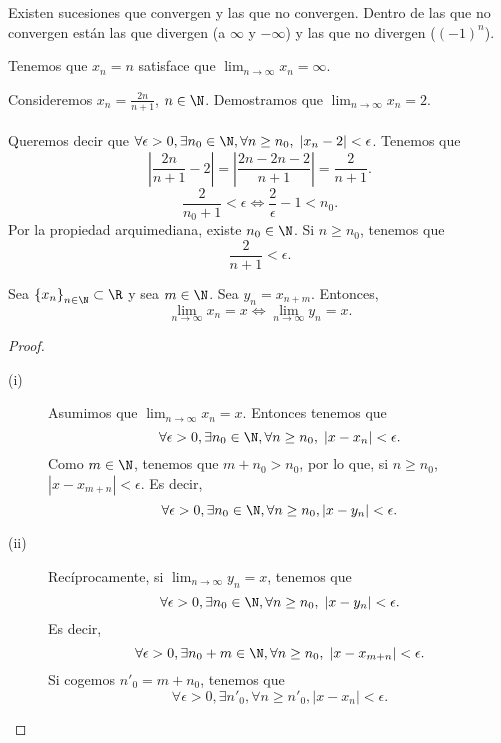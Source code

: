 \begin{observation}
\normalfont Existen sucesiones que convergen y las que no convergen. Dentro de las que no convergen están las que divergen (a $\displaystyle \infty $ y $\displaystyle -\infty $) y las que no divergen ($\displaystyle \left(-1\right)^{n} $).
\end{observation}

\begin{eg}
\normalfont Tenemos que $\displaystyle x_{n} = n $ satisface que $\displaystyle \lim_{n \to \infty}x_{n} = \infty $.
\end{eg}

\begin{eg}
\normalfont Consideremos $\displaystyle x_{n} = \frac{2n}{n+1} $, $\displaystyle n \in \N $. Demostramos que $\displaystyle \lim_{n \to \infty}x_{n} = 2 $. \\ \\
Queremos decir que $\displaystyle \forall \epsilon > 0, \exists n_{0} \in \N, \forall n\geq n_{0}, \; \left|x_{n}-2\right| < \epsilon  $. Tenemos que
\[ \left|\frac{2n}{n+1} -2\right| = \left|\frac{2n-2n-2}{n+1}\right| = \frac{2}{n+1} .\]
\[\frac{2}{n_{0}+1} < \epsilon \iff \frac{2}{\epsilon }-1 < n_{0} .\]
Por la propiedad arquimediana, existe $\displaystyle n_{0} \in \N $. Si $\displaystyle n \geq n_{0} $, tenemos que 
\[\frac{2}{n+1} < \epsilon  .\]
\end{eg}

\begin{fprop}[]
	\normalfont Sea $\displaystyle \left\{ x_{n}\right\} _{n\in\N}\subset\R $ y sea $\displaystyle m \in \N $. Sea $\displaystyle y_{n} = x_{n+m} $. Entonces, 
	\[\lim_{n \to \infty}x_{n} = x \iff \lim_{n \to \infty}y_{n} = x .\]
\end{fprop}

\begin{proof}
\begin{description}
\item[(i)] Asumimos que $\displaystyle \lim_{n \to \infty}x_{n} = x $. Entonces tenemos que 
	\[\forall \epsilon > 0, \exists n_{0} \in \N, \forall n \geq n_{0}, \; \left|x - x_{n}\right| < \epsilon  .\]
Como $\displaystyle m \in \N $, tenemos que $\displaystyle m + n_{0} > n_{0} $, por lo que, si $\displaystyle n \geq n_{0} $, $\displaystyle \left|x - x_{m+n}\right|< \epsilon  $. Es decir, 
\[\forall \epsilon > 0, \exists n_{0} \in \N, \forall n \geq n_{0}, \left|x - y_{n}\right| < \epsilon  .\]
\item[(ii)] Recíprocamente, si $\displaystyle \lim_{n \to \infty}y_{n} = x $, tenemos que 
	\[\forall \epsilon > 0, \exists n_{0} \in \N, \forall n \geq n_{0}, \; \left|x - y_{n}\right| < \epsilon  .\]
Es decir, 
	\[\forall \epsilon > 0, \exists n_{0}+m \in \N, \forall n \geq n_{0}, \; \left|x - x_{m+n}\right| < \epsilon  .\]
Si cogemos $\displaystyle n'_{0} = m + n_{0}$, tenemos que 
\[\forall \epsilon > 0, \exists n'_{0}, \forall n\geq n'_{0}, \left|x - x_{n}\right| < \epsilon  .\]
\end{description}
\end{proof}

